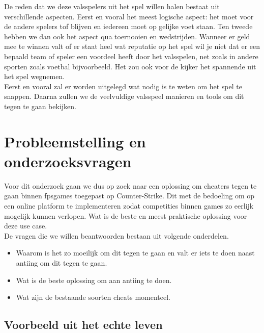 \documentclass[pdftex,a4paper,12pt,twoside]{report}
\begin{document}
De reden dat we deze valsspelers uit het spel willen halen bestaat uit verschillende aspecten. Eerst en vooral het meest logische aspect: het moet voor de andere spelers tof blijven en iedereen moet op gelijke voet staan. Ten tweede hebben we dan ook het aspect qua toernooien en wedstrijden. Wanneer er geld mee te winnen valt of er staat heel wat reputatie op het spel wil je niet dat er een bepaald team of speler een voordeel heeft door het valsspelen, net zoals in andere sporten zoals voetbal bijvoorbeeld. Het zou ook voor de kijker het spannende uit het spel wegnemen.
\\ 

Eerst en vooral zal er worden uitgelegd wat nodig is te weten om het spel te snappen. Daarna zullen we de veelvuldige valsspeel manieren en tools om dit tegen te gaan bekijken.


\section{Probleemstelling en onderzoeksvragen}
\label{sec:onderzoeksvragen}

Voor dit onderzoek gaan we dus op zoek naar een oplossing om \gls{cheat}ers tegen te gaan binnen \gls{fpsgames} toegepast op Counter-Strike. Dit met de bedoeling om op een online platform te implementeren zodat competities binnen games zo eerlijk mogelijk kunnen verlopen. Wat is de beste en meest praktische oplossing voor deze use case. 
\\

De vragen die we willen beantwoorden bestaan uit volgende onderdelen.
\begin{itemize}
\item Waarom is het zo moeilijk om dit tegen te gaan en valt er iets te doen naast \gls{anti}ing om dit tegen te gaan.
\item Wat is de beste oplossing om aan \gls{anti}ing te doen.
\item Wat zijn de bestaande soorten \gls{cheat}s momenteel. 
\end{itemize}


\subsection{Voorbeeld uit het echte leven}
\label{subsec:voorbeeld}
\end{document}
